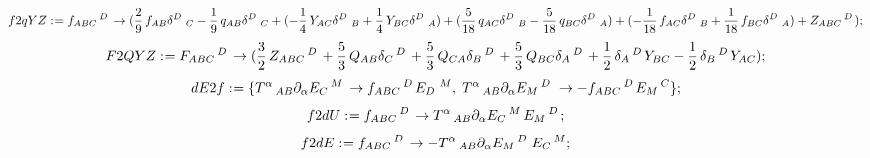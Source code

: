 \documentclass[11pt]{article}
\def\specialcolon{\mathrel{\mathop{:}}\hspace{-.5em}}
\begin{document}
\begin{dmath*}[compact, spread=2pt]
f2qYZ\specialcolon{}= {f}_{A B C}\,^{D\, } \rightarrow (\frac{2}{9}\, {f}_{A B} {\delta}^{D\, }\,_{C} - \frac{1}{9}\, {q}_{A B} {\delta}^{D\, }\,_{C} + ( - \frac{1}{4}\, {Y}_{A C} {\delta}^{D\, }\,_{B} + \frac{1}{4}\, {Y}_{B C} {\delta}^{D\, }\,_{A}) + (\frac{5}{18}\, {q}_{A C} {\delta}^{D\, }\,_{B} - \frac{5}{18}\, {q}_{B C} {\delta}^{D\, }\,_{A}) + ( - \frac{1}{18}\, {f}_{A C} {\delta}^{D\, }\,_{B} + \frac{1}{18}\, {f}_{B C} {\delta}^{D\, }\,_{A}) + {Z}_{A B C}\,^{D\, });
\end{dmath*}
\begin{dmath*}[compact, spread=2pt]
F2QYZ\specialcolon{}= {F}_{A B C}\,^{D\, } \rightarrow (\frac{3}{2}\, {Z}_{A B C}\,^{D\, } + \frac{5}{3}\, {Q}_{A B} {\delta}_{C}\,^{D\, } + \frac{5}{3}\, {Q}_{C A} {\delta}_{B}\,^{D\, } + \frac{5}{3}\, {Q}_{B C} {\delta}_{A}\,^{D\, } + \frac{1}{2}\, {\delta}_{A}\,^{D\, } {Y}_{B C} - \frac{1}{2}\, {\delta}_{B}\,^{D\, } {Y}_{A C});
\end{dmath*}
\begin{dmath*}[compact, spread=2pt]
dE2f\specialcolon{}= \{{T}^{\alpha}\,_{A B} {\partial}_{\alpha}{{E}_{C}\,^{M}}\,  \rightarrow {f}_{A B C}\,^{D\, } {E}_{D\, }\,^{M},\; {T}^{\alpha}\,_{A B} {\partial}_{\alpha}{{E}_{M}\,^{D\, }}\,  \rightarrow -{f}_{A B C}\,^{D\, } {E}_{M}\,^{C}\};
\end{dmath*}
\begin{dmath*}[compact, spread=2pt]
f2dU\specialcolon{}= {f}_{A B C}\,^{D\, } \rightarrow {T}^{\alpha}\,_{A B} {\partial}_{\alpha}{{E}_{C}\,^{M}}\,  {E}_{M}\,^{D\, };
\end{dmath*}
\begin{dmath*}[compact, spread=2pt]
f2dE\specialcolon{}= {f}_{A B C}\,^{D\, } \rightarrow -{T}^{\alpha}\,_{A B} {\partial}_{\alpha}{{E}_{M}\,^{D\, }}\,  {E}_{C}\,^{M};
\end{dmath*}
\end{document}
